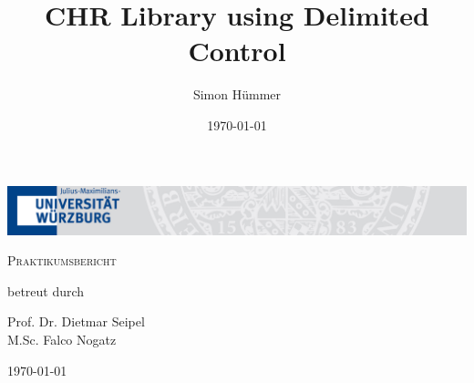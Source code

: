 \documentclass[12pt,a4paper,twoside]{article}
\theoremstyle{plain}\newtheorem{Lemma}{Lemma}
\theoremstyle{plain}\newtheorem{Satz}[Lemma]{Satz}
\theoremstyle{definition}\newtheorem{Definition}[Lemma]{Definition}
\theoremstyle{definition}\newtheorem*{Example}{Example}
\theoremstyle{remark}\newtheorem*{Bemerkung}{Bemerkung}
\begin{document}
\title{CHR Library using Delimited Control}
\author{Simon Hümmer}
\newcommand{\projectName}{Praktikumsbericht} %

\date{\today}
\begin{titlepage}
	\centering
	\hspace*{-2.54cm}\includegraphics[width=\paperwidth]{logo.png}\par\vspace{1cm}
	\vspace{1cm}
	{\scshape\Large \projectName\par}
	\vspace{1.5cm}
	{\huge\bfseries \thetitle\par}
	{\Large \theauthor\par}
	\vfill
	betreut durch\par
	Prof. Dr. Dietmar Seipel\\
	M.Sc. Falco Nogatz

	\vfill

	{\large \today \par}
\end{titlepage}
\newpage
\tableofcontents
\newpage








\newpage

\end{document}
